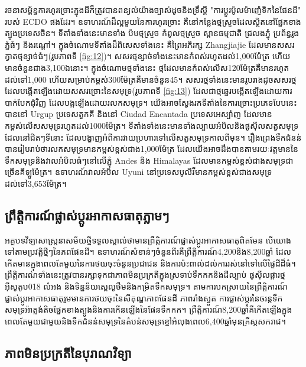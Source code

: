\documentclass[10pt,twocolumn,letterpaper]{article}
\begin{document}
រចនាសម្ព័ន្ធការហូរច្រោះក្នុងដីក៏ត្រូវបានពន្យល់យ៉ាងច្បាស់ដូចនិងទ្រឹស្តី "ការប្តូរប៉ូលម៉ាញ៉េទិកនៃផែនដី" របស់ ECDO ផងដែរ។ ឧទាហរណ៍ដ៏ល្អមួយនៃការហូរច្រោះ គឺនៅកន្លែងថ្មស្រួចដែលស្ថិតនៅផ្នែកខាងត្បូងប្រទេសចិន\cite{82}។ ទីតាំងទាំងនេះមានទាំង ប៉មថ្មស្រួច កំពូលថ្មស្រួច ស្ពានធម្មជាតិ ជ្រលងភ្នុំ ប្រព័ន្ធរូងភ្នំធំៗ និងរណ្តៅ។ ក្នុងចំណោមទីតាំងដ៏ពិសេសទាំងនេះ គឺព្រៃអភិរក្ស Zhangjiajie ដែលមានសសរក្វាតថ្មខ្សាច់ធំៗ(រូបភាពទី \ref{fig:12})\cite{84}។ សសរថ្មខ្សាច់ទាំងនេះមានកំពស់រហូតដល់1,000ម៉ែត្រ ហើយមានចំនួនជាង3,100ឯនោះ។ ក្នុងចំណោមថ្មទាំងនេះ ថ្មដែលមានកំពស់លើស120ម៉ែត្រគឺមានរហូតដល់ទៅ1,000 ហើយសម្រាប់កម្ពស់300ម៉ែត្រគឺមានចំនួន45\cite{85}។ សសរថ្មទាំងនេះមានរូបរាងដូចសសរថ្មដែលបង្កើតឡើងដោយសសរច្រោះនៃសមុទ្រ(រូបភាពទី \ref{fig:13}) ដែលជាថ្មឆ្នេរបង្កើតឡើងដោយការបាក់បែកជុំវិញ ដែលបង្កឡើងដោយរលកសមុទ្រ។ យើងអាចស្វែងរកទីតាំងនៃការច្រោះប្រភេទបែបនេះបាននៅ Urgup ប្រទេសតួកគី និងនៅ Ciudad Encantada ប្រទេសអេស្ប៉ាញ ដែលមានកម្ពស់លើសសមុទ្ររហូតដល់1000ម៉ែត្រ។ ទីតាំងទាំងនេះមានទាំងល្បាយអំបិលនិងផូសុីលសត្វសមុទ្រដែលនៅជិតៗទីនោះ ដែលបង្ហាញអំពីការវាយប្រហារទៅលើសត្វសមុទ្រកាលពីមុន\cite{15,86,87}។ រឿងព្រេងទឹកជំនន់\cite{3}បានរៀបរាប់ថារលកសមុទ្រមានកម្ពស់ខ្ពស់ជាង1,000ម៉ែត្រ ដែលយើងអាចដឹងបានតាមរយៈវត្តមាននៃទឹកសមុទ្រនិងវាលអំបិលធំៗនៅលើភ្នុំ Andes និង Himalayas ដែលមានកម្ពស់ខ្ពស់ជាងសមុទ្រជាច្រើនគីឡូម៉ែត្រ។ ឧទាហរណ៍វាលអំបិល Uyuni នៅប្រទេសបូលីវីមានកម្ពស់ខ្ពស់ជាងសមុទ្រដល់ទៅ3,653ម៉ែត្រ\cite{94}។

\subsection{ព្រឹត្តិការណ៍ផ្លាស់ប្ដូរអាកាសធាតុភ្លាមៗ}

អត្ថបទវិទ្យាសាស្ត្រនាសម័យថ្មីទទួលស្គាល់ថាមានព្រឹត្តិការណ៍ផ្លាស់ប្ដូរអាកាសធាតុពិតមែន បើយោងទៅតាមប្រវត្តិថ្មីៗនៃភពផែនដី។ ឧទាហរណ៍សំខាន់ៗចំនួនពីរគឺព្រឹត្តិការណ៍4,200និង8,200ឆ្នាំ ដែលកើតមានក្នុងពេលតែមួយនៃការថយចុះចំនួនប្រជាជន និងការប៉ះពាល់ដល់ការរស់នៅទៅលើផ្ទៃដីដ៏ធំ។ ព្រឹត្តិការណ៍ទាំងនេះត្រូវបានរក្សាទុកជាភាពមិនប្រក្រតីក្នុងស្រទាប់ទឹកកកនិងដីល្បាប់ ផូសុីលផ្ការថ្ម អុីសូតូប018 លំអង និងទិន្នន័យស្ពេលូថឹមនិងកម្រិតទឹកសមុទ្រ។ តាមការបកស្រាយនៃព្រឹត្តិការណ៍ផ្លាស់ប្ដូរអាកាសធាតុរួមមានការថយចុះនៃសីតុណ្ហភាពផែនដី ភាពរាំងស្ងួត ការផ្លាស់ប្តូរនៃចរន្តទឹកសមុទ្រអ៉ាត្លង់តិចផ្នែកខាងត្បូងនិងការកើនឡើងនៃផែនទឹកកក\cite{90,91,92}។ ព្រឹត្តិការណ៍8,200ឆ្នាំគឺកើតឡើងក្នុងពេលតែមួយជាមួយនិងទឹកជំនន់សមុទ្រនៃតំបន់សមុទ្រខ្មៅអំលុងពេល6,400ឆ្នាំមុនគ្រឹស្តសករាជ\cite{93}។

\subsection{ភាពមិនប្រក្រតីនៃបុរាណវិទ្យា}
\end{document}
